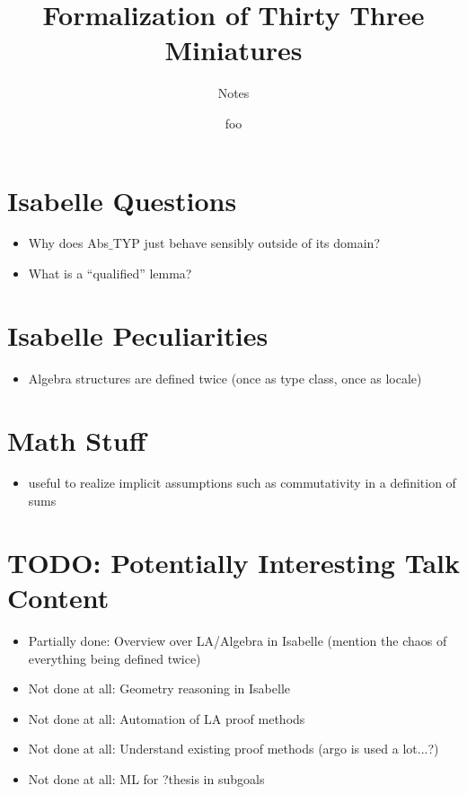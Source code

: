 \documentclass[runningheads]{llncs}
\begin{document}
	
	\title{Formalization of Thirty Three Miniatures}
	\subtitle{Notes}
	
	\author{foo}
	\maketitle              %
	
	\section{Isabelle Questions}
	\begin{itemize}
		\item Why does Abs$\_$TYP just behave sensibly outside of its domain?
		\item What is a \enquote{qualified} lemma?
	\end{itemize}
	
	\section{Isabelle Peculiarities}
	\begin{itemize}
		\item Algebra structures are defined twice (once as type class, once as locale)
	\end{itemize}
	
	\section{Math Stuff}
	\begin{itemize}
		\item useful to realize implicit assumptions such as commutativity in a definition of sums
	\end{itemize}
	
	\section{TODO: Potentially Interesting Talk Content}
	\begin{itemize}
		\item Partially done: Overview over LA/Algebra in Isabelle (mention the chaos of everything being defined twice)
		\item Not done at all: Geometry reasoning in Isabelle
		\item Not done at all: Automation of LA proof methods
		\item Not done at all: Understand existing proof methods (argo is used a lot...?)
		\item Not done at all: ML for ?thesis in subgoals
	\end{itemize}
	
\end{document}
